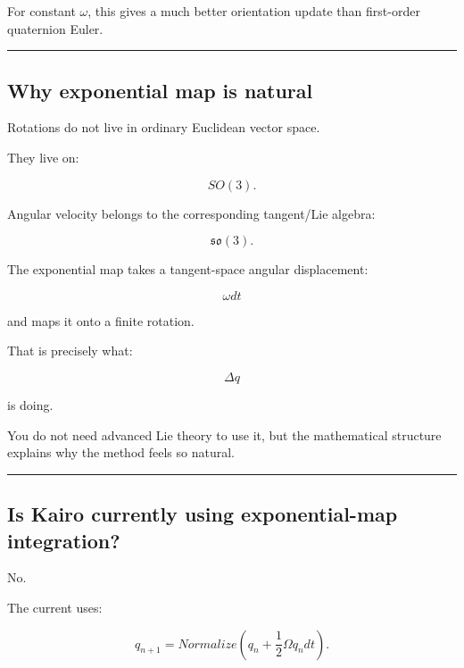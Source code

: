 For constant \(\omega\), this gives a much better orientation update than first-order quaternion Euler.

\begin{center}\rule{0.5\linewidth}{0.5pt}\end{center}

\subsection{Why exponential map is natural}\label{06-engine-ii-ch037-why-exponential-map-is-natural}

\hypertarget{06-engine-ii-ch037-why-exponential-map-is-natural}{}

Rotations do not live in ordinary Euclidean vector space.

They live on:

\[
SO(3).
\]

Angular velocity belongs to the corresponding tangent/Lie algebra:

\[
\mathfrak{so}(3).
\]

The exponential map takes a tangent-space angular displacement:

\[
\omega dt
\]

and maps it onto a finite rotation.

That is precisely what:

\[
\Delta q
\]

is doing.

You do not need advanced Lie theory to use it, but the mathematical structure explains why the method feels so natural.

\begin{center}\rule{0.5\linewidth}{0.5pt}\end{center}

\subsection{Is Kairo currently using exponential-map integration?}\label{06-engine-ii-ch037-is-kairo-currently-using-exponential-map-integration}

\hypertarget{06-engine-ii-ch037-is-kairo-currently-using-exponential-map-integration}{}

No.

The current  uses:

\[
q_{n+1}
=
Normalize(
q_n+
\frac12\Omega q_n dt
).
\]

